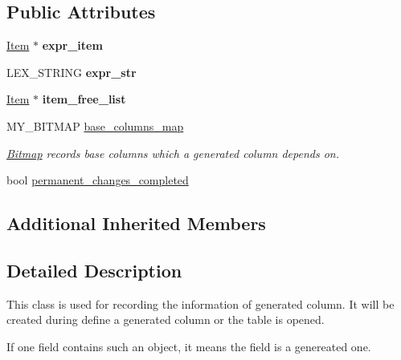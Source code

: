 \subsection*{Public Attributes}
\begin{DoxyCompactItemize}
\item 
\mbox{\label{classGenerated__column_a0e442a5a02e2f439ece72f07a038284d}} 
\mbox{\hyperlink{classItem}{Item}} $\ast$ {\bfseries expr\+\_\+item}
\item 
\mbox{\label{classGenerated__column_ad3ccaf3b5c23b5ca8c8ebde1dfd7c9c4}} 
L\+E\+X\+\_\+\+S\+T\+R\+I\+NG {\bfseries expr\+\_\+str}
\item 
\mbox{\label{classGenerated__column_a93c9281e085bd66c208d53459f2e7762}} 
\mbox{\hyperlink{classItem}{Item}} $\ast$ {\bfseries item\+\_\+free\+\_\+list}
\item 
\mbox{\label{classGenerated__column_a1526d340dd7275effe962e3147707dcb}} 
M\+Y\+\_\+\+B\+I\+T\+M\+AP \mbox{\hyperlink{classGenerated__column_a1526d340dd7275effe962e3147707dcb}{base\+\_\+columns\+\_\+map}}
\begin{DoxyCompactList}\small\item\em \mbox{\hyperlink{classBitmap}{Bitmap}} records base columns which a generated column depends on. \end{DoxyCompactList}\item 
bool \mbox{\hyperlink{classGenerated__column_a6005a897023a9d9669d8a3a43534943e}{permanent\+\_\+changes\+\_\+completed}}
\end{DoxyCompactItemize}
\subsection*{Additional Inherited Members}


\subsection{Detailed Description}
This class is used for recording the information of generated column. It will be created during define a generated column or the table is opened.

If one field contains such an object, it means the field is a genereated one. 

